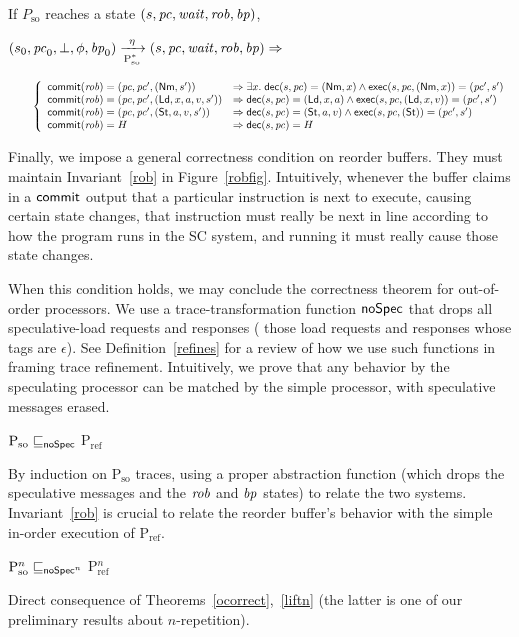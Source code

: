 \begin{figure*}[t]
\begin{inv}
If $P_\text{so}$ reaches a state $(s, \pc, \wait, \rob, \ppc)$, \ie{}

$\io{P$_\text{so}^{*}$}{s_0,\pc_0,\bot,\phi,\ppc_0}{s,\pc,\wait,\rob,\ppc}{\eta} \Rightarrow$

\begin{math}
\;\;\;\;\;\;\;\;\left\{
\begin{array}{ll}
\commit(\rob) = (\pc, \pc', (\nm, s')) &\Rightarrow
\exists x. \; \dec(s,\pc) = (\nm, x) \wedge \exec(s,\pc, (\nm,x)) =
(\pc', s')\\
\commit(\rob) = (\pc, \pc', (\ld, x, a, v, s')) & \Rightarrow
\dec(s,\pc) = (\ld, x,a) \wedge \exec(s,\pc, (\ld,x,v)) = (\pc', s')\\
\commit(\rob) = (\pc, \pc', (\st, a, v, s')) &\Rightarrow
\dec(s,\pc) = (\st, a,v) \wedge \exec(s,\pc, (\st)) =
(\pc', s')\\
\commit(\rob) = H & \Rightarrow
\dec(s, \pc) = H\\
\end{array}
\right.\end{math}
\label{rob}
\end{inv}
\vspace{-.5cm}
\caption{Correctness of reorder buffer}
\label{robfig}
\end{figure*}

Finally, we impose a general correctness condition on reorder
buffers.  They must maintain Invariant~\ref{rob} in Figure~\ref{robfig}.
Intuitively, whenever the buffer claims in a $\commit$
output that a particular instruction is next to execute, causing
certain state changes, that instruction must really be next in line according
to how the program runs in the SC system, and running it must really cause
those state changes.

When this condition holds, we may conclude the correctness theorem for
out-of-order processors.  We use a trace-transformation function
$\noSpec$ that drops all speculative-load requests and responses (\ie{} those load requests and responses whose tags are $\epsilon$).
See Definition~\ref{refines} for a review of how we use such
functions in framing trace refinement.  Intuitively, we prove that any
behavior by the speculating processor can be matched by the simple
processor, with speculative messages erased.

\begin{theorem}
\label{ocorrect}
$\text{P$_\text{so}$} \sqsubseteq_\noSpec$ P$_\text{ref}$
\end{theorem}
\begin{prf}
By induction on P$_\text{so}$ traces, using a proper abstraction
function (which drops the speculative messages and the $\rob$ and $\ppc$ states) to relate the two systems.  Invariant~\ref{rob} is crucial to
relate the reorder buffer's behavior with the simple in-order
execution of P$_\text{ref}$.
\end{prf}

\begin{corollary}
\label{ges}
$\text{P$^n_\text{so}$} \sqsubseteq_{\noSpec^n}$ P$_\text{ref}^n$
\end{corollary}
\begin{prf}
Direct consequence of Theorems~\ref{ocorrect},~\ref{liftn} (the
latter is one of our preliminary results about $n$-repetition).
\end{prf}
